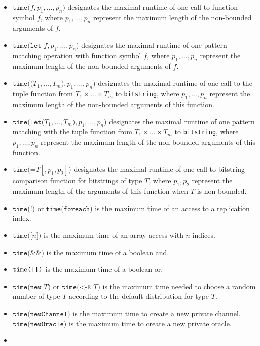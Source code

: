 \begin{itemize}
\item
$\texttt{time(}f, p_1, \ldots, p_n\texttt{)}$ designates the maximal runtime of
one call to function symbol $f$, where $p_1, \ldots, \allowbreak p_n$ represent
the maximum length of the non-bounded arguments of $f$.
\item
$\texttt{time(let }f, p_1, \ldots, p_n\texttt{)}$ designates the
maximal runtime of one pattern matching operation with function symbol
$f$, where $p_1, \ldots, p_n$ represent the maximum length of the
non-bounded arguments of $f$.
\item
$\texttt{time((}T_1, \ldots, T_m\texttt{)}, p_1, \ldots, p_n\texttt{)}$ designates the
maximal runtime of one call to the tuple function from $T_1 \times
\ldots \times T_m$ to \texttt{bitstring}, where $p_1, \ldots, p_n$
represent the maximum length of the non-bounded arguments of this
function.
\item
$\texttt{time(let(}T_1, \ldots, T_m\texttt{)}, p_1, \ldots, p_n\texttt{)}$ designates the
maximal runtime of one pattern matching with the tuple function from
$T_1 \times \ldots \times T_m$ to \texttt{bitstring}, where $p_1, \ldots, p_n$
represent the maximum length of the non-bounded arguments of this function.
\item
$\texttt{time(=}T[, p_1, p_2]\texttt{)}$ designates the
maximal runtime of one call to bitstring comparison function
for bitstrings of type $T$, where $p_1, p_2$ represent the
maximum length of the arguments of this function when $T$ is non-bounded.
\item
$\texttt{time(!)}$ or $\texttt{time(foreach)}$ is the maximum time of an access to a replication index.
\item
$\texttt{time([}n\texttt{])}$ is the maximum time of an array access 
with $n$ indices.
\item
$\texttt{time(\&\&)}$ is the maximum time of a boolean and.
\item
$\texttt{time(\string|\string|)}$ is the maximum time of a boolean or.
\item
$\texttt{time(new }T\texttt{)}$ or $\texttt{time(<-R }T\texttt{)}$ 
is the maximum time needed to choose
a random number of type $T$ according to the default distribution for type $T$.
\item
\ifchannels
$\texttt{time(newChannel)}$ is the maximum time to create a new
private channel.
\else
$\texttt{time(newOracle)}$ is the maximum time to create a new
private oracle.
\fi
\item

\end{itemize}
